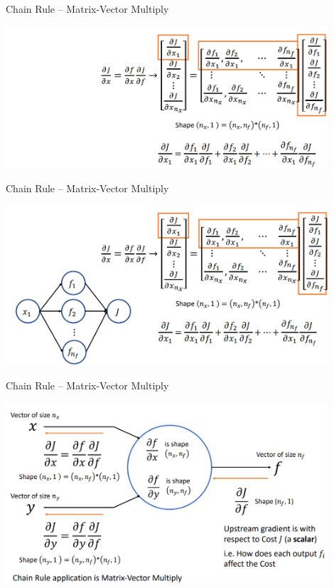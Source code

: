 \documentclass[serif, aspectratio=169]{beamer}
\begin{document}
\begin{frame}{Chain Rule – Matrix-Vector Multiply}
    \begin{center}
        \includegraphics[width=12cm]{pic/chain4.png}  
    \end{center}
\end{frame}

\begin{frame}{Chain Rule – Matrix-Vector Multiply}
    \begin{center}
        \includegraphics[width=12cm]{pic/chain5.png}  
    \end{center}
\end{frame}

\begin{frame}{Chain Rule – Matrix-Vector Multiply}
    \begin{center}
        \includegraphics[width=12cm]{pic/chain6.png}  
    \end{center}
\end{frame}
\end{document}
